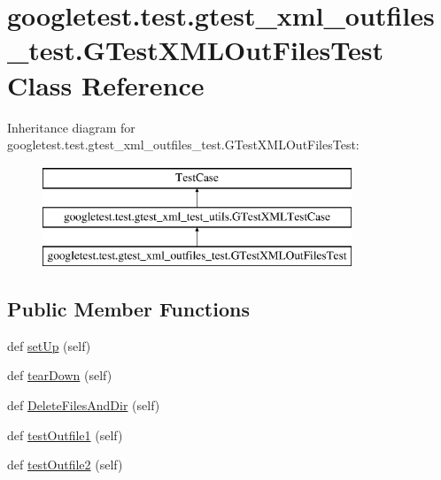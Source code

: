 \hypertarget{classgoogletest_1_1test_1_1gtest__xml__outfiles__test_1_1_g_test_x_m_l_out_files_test}{}\section{googletest.\+test.\+gtest\+\_\+xml\+\_\+outfiles\+\_\+test.\+G\+Test\+X\+M\+L\+Out\+Files\+Test Class Reference}
\label{classgoogletest_1_1test_1_1gtest__xml__outfiles__test_1_1_g_test_x_m_l_out_files_test}
Inheritance diagram for googletest.\+test.\+gtest\+\_\+xml\+\_\+outfiles\+\_\+test.\+G\+Test\+X\+M\+L\+Out\+Files\+Test\+:\begin{figure}[H]
\begin{center}
\leavevmode
\includegraphics[height=3.000000cm]{dd/dc5/classgoogletest_1_1test_1_1gtest__xml__outfiles__test_1_1_g_test_x_m_l_out_files_test}
\end{center}
\end{figure}
\subsection*{Public Member Functions}
\begin{DoxyCompactItemize}
\item 
def \mbox{\hyperlink{classgoogletest_1_1test_1_1gtest__xml__outfiles__test_1_1_g_test_x_m_l_out_files_test_a8af085ad32f8164a4a0225830545ce4d}{set\+Up}} (self)
\item 
def \mbox{\hyperlink{classgoogletest_1_1test_1_1gtest__xml__outfiles__test_1_1_g_test_x_m_l_out_files_test_a6e03db9a81c32f97d1a4a1bac86121b8}{tear\+Down}} (self)
\item 
def \mbox{\hyperlink{classgoogletest_1_1test_1_1gtest__xml__outfiles__test_1_1_g_test_x_m_l_out_files_test_a986d185953137e16f61cfebfa6091f52}{Delete\+Files\+And\+Dir}} (self)
\item 
def \mbox{\hyperlink{classgoogletest_1_1test_1_1gtest__xml__outfiles__test_1_1_g_test_x_m_l_out_files_test_a4906567538322e352d21c875ce45871f}{test\+Outfile1}} (self)
\item 
def \mbox{\hyperlink{classgoogletest_1_1test_1_1gtest__xml__outfiles__test_1_1_g_test_x_m_l_out_files_test_ac2f102c03620d9c7260099334062acb4}{test\+Outfile2}} (self)
\end{DoxyCompactItemize}
